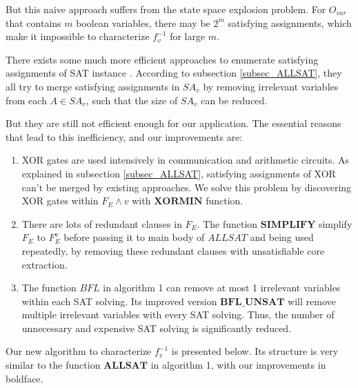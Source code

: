 \documentclass[journal]{IEEEtran}
\begin{document}
\begin{equation}\label{fneg1v}
\end{equation}

But this naive approach suffers from the state space explosion problem.
For $O_{var}$ that contains $m$ boolean variables,
there may be $2^m$ satisfying assignments,
which make it impossible to characterize $f^{-1}_v$ for large $m$.

There exists  some much more efficient approaches
to enumerate satisfying assignments of SAT instance
\cite{PRIMECLAUSE,SATUNBMC,MINASS,EFFCON,MINCEX,MEMEFFALLSAT,REPARAM,EFFSATUSMCCO}.
According to subsection \ref{subsec_ALLSAT},
they all try to merge satisfying assignments in $SA_v$ by removing irrelevant variables from each $A\in SA_v$,
such that the size of $SA_v$ can be reduced.

But they are still not efficient enough for our application.
The essential reasons that lead to this inefficiency,
and our improvements are:
\begin{enumerate}
\item XOR gates are used intensively in communication and arithmetic circuits.
As explained in subsection \ref{subsec_ALLSAT},
satisfying assignments of XOR can't be merged by existing approaches.
We solve this problem by discovering XOR gates within $F_E\wedge v$ with $\boldsymbol{XORMIN}$ function.
\item There are lots of redundant clauses in $F_E$.
The function $\boldsymbol{SIMPLIFY}$ simplify $F_E$ to $F_E^v$ before passing it to main body of $ALLSAT$ and being used repeatedly,
by removing these redundant clauses with unsatisfiable core extraction.
\item The function $BFL$ in algorithm 1 can remove at most 1 irrelevant variables within each SAT solving. Its improved version $\boldsymbol{BFL\_UNSAT}$ will remove multiple irrelevant variables with every SAT solving. Thus, the number of unnecessary and expensive SAT solving is significantly reduced.
\end{enumerate}

Our new algorithm to characterize $f^{-1}_v$ is presented below.
Its structure is very similar to the function $\boldsymbol{ALLSAT}$ in algorithm 1,
with our improvements in boldface.
\end{document}
